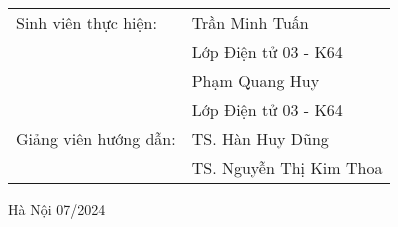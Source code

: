 \begin{titlepage}
\begin{center}
  \begin{table}[H]%
       \centering
       \begin{tabular}{l l}
            \fontsize{14pt}{0pt}\selectfont Sinh viên thực hiện:      & \fontsize{14pt}{0pt}\selectfont Trần Minh Tuấn\\
              &\fontsize{14pt}{0pt}\selectfont Lớp Điện tử 03 - K64  \vspace{6pt} \\
              &\fontsize{14pt}{0pt}\selectfont Phạm Quang Huy  \\
              &\fontsize{14pt}{0pt}\selectfont Lớp Điện tử 03 - K64 \vspace{6pt} \\
            \fontsize{14pt}{0pt}\selectfont Giảng viên hướng dẫn: & \fontsize{14pt}{0pt}\selectfont TS. Hàn Huy Dũng \\   
              &\fontsize{14pt}{0pt}\selectfont TS. Nguyễn Thị Kim Thoa \vspace{6pt} \\
       \end{tabular}
  \end{table}
  \vspace{1.3cm} %
  \fontsize{14pt}{0pt}\selectfont Hà Nội 07/2024
  \end{center}
  \end{titlepage}
  
  \cleardoublepage
  
